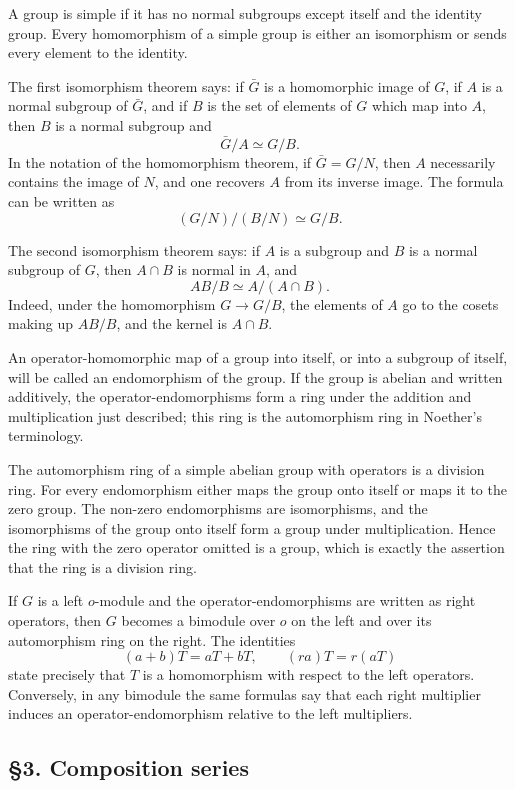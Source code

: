 \documentclass[
  12pt,
]{article}
\begin{document}
A group is simple if it has no normal subgroups except itself and the
identity group. Every homomorphism of a simple group is either an
isomorphism or sends every element to the identity.

The first isomorphism theorem says: if \(\bar G\) is a homomorphic image
of \(G\), if \(A\) is a normal subgroup of \(\bar G\), and if \(B\) is
the set of elements of \(G\) which map into \(A\), then \(B\) is a
normal subgroup and \[
  \bar G/A\simeq G/B.
\] In the notation of the homomorphism theorem, if \(\bar G=G/N\), then
\(A\) necessarily contains the image of \(N\), and one recovers \(A\)
from its inverse image. The formula can be written as \[
  (G/N)/(B/N)\simeq G/B.
\]

The second isomorphism theorem says: if \(A\) is a subgroup and \(B\) is
a normal subgroup of \(G\), then \(A\cap B\) is normal in \(A\), and \[
  AB/B\simeq A/(A\cap B).
\] Indeed, under the homomorphism \(G\to G/B\), the elements of \(A\) go
to the cosets making up \(AB/B\), and the kernel is \(A\cap B\).

An operator-homomorphic map of a group into itself, or into a subgroup
of itself, will be called an endomorphism of the group. If the group is
abelian and written additively, the operator-endomorphisms form a ring
under the addition and multiplication just described; this ring is the
automorphism ring in Noether's terminology.

The automorphism ring of a simple abelian group with operators is a
division ring. For every endomorphism either maps the group onto itself
or maps it to the zero group. The non-zero endomorphisms are
isomorphisms, and the isomorphisms of the group onto itself form a group
under multiplication. Hence the ring with the zero operator omitted is a
group, which is exactly the assertion that the ring is a division ring.

If \(G\) is a left \(o\)-module and the operator-endomorphisms are
written as right operators, then \(G\) becomes a bimodule over \(o\) on
the left and over its automorphism ring on the right. The identities \[
  (a+b)T=aT+bT,
  \qquad
  (ra)T=r(aT)
\] state precisely that \(T\) is a homomorphism with respect to the left
operators. Conversely, in any bimodule the same formulas say that each
right multiplier induces an operator-endomorphism relative to the left
multipliers.

\subsection{§3. Composition series}\label{composition-series}
\end{document}
